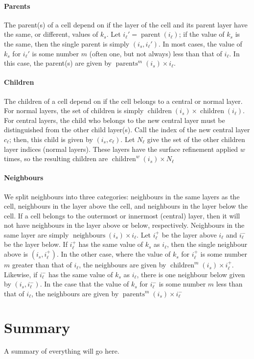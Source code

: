 \paragraph{Parents}
The parent(s) of a cell depend on if the layer of the cell and its parent layer have the same, or different, values of $k_s$.
Let $i_\ell' = \operatorname{parent}(i_\ell)$; if the value of $k_s$ is the same, then the single parent is simply $(i_s, i_\ell')$.
In most cases, the value of $k_s$ for $i_\ell'$ is some number $m$ (often one, but not always) less than that of $i_\ell$.
In this case, the parent(s) are given by $\operatorname{parents}^m(i_s) \times i_\ell$.


\paragraph{Children} The children of a cell depend on if the cell belongs to a central or normal layer.
For normal layers, the set of children is simply $\operatorname{children}(i_s) \times \operatorname{children}(i_\ell)$.
For central layers, the child who belongs to the new central layer must be distinguished from the other child layer(s).
Call the index of the new central layer $c_\ell$; then, this child is given by $(i_s, c_\ell)$.
Let $ N_\ell$ give the set of the other children layer indices (normal layers).
These layers have the surface refinement applied $w$ times, so the resulting children are $\operatorname{children}^w(i_s) \times N_\ell$


\paragraph{Neighbours} We split neighbours into three categories: neighbours in the same layers as the cell, neighbours in the layer above the cell, and neighbours in the layer below the cell.
If a cell belongs to the outermost or innermost (central) layer, then it will not have neighbours in the layer above or below, respectively.
Neighbours in the same layer are simply $\operatorname{neighbours}(i_s) \times i_\ell$.
Let $i_\ell^+$ be the layer above $i_\ell$ and $i_\ell^-$ be the layer below.
If $i_\ell^+$ has the same value of $k_s$ as $i_\ell$, then the single neighbour above is $(i_s, i_\ell^+)$.
In the other case, where the value of $k_s$ for $i_\ell^+$ is some number $m$ greater than that of $i_\ell$, the neighbours are given by $\operatorname{children}^m(i_s) \times i_\ell^+$.
Likewise, if $i_\ell^-$ has the same value of $k_s$ as $i_\ell$, there is one neighbour below given by $(i_s, i_\ell^-)$.
In the case that the value of $k_s$ for $i_\ell^-$ is some number $m$ less than that of $i_\ell$, the neighbours are given by $\operatorname{parents}^m(i_s) \times i_\ell^-$

\section{Summary}
A summary of everything will go here.